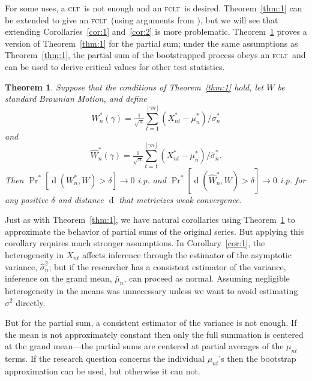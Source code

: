 \documentclass[11pt]{article}
\newtheorem{thm}{Theorem}
\theoremstyle{definition}
\DeclareMathOperator{\dist}{d}
\DeclareMathOperator{\pr}{Pr}
\newcommand{\clt}{\textsc{clt}}
\newcommand{\fclt}{\textsc{fclt}}
\begin{document}
For some uses, a \clt\ is not enough and an \fclt\ is desired.
Theorem~\ref{thm:1} can be extended to give an \fclt\ (using
arguments from \citealp{JoD:00b}), but we will see that extending 
Corollaries~\ref{cor:1} and~\ref{cor:2} is more problematic.
Theorem~\ref{thm:2} proves a version of Theorem~\ref{thm:1} for the
partial sum; under the same assumptions as Theorem~\ref{thm:1}, the
partial sum of the bootstrapped process obeys an \fclt\ and can be
used to derive critical values for other test statistics.

\begin{thm}\label{thm:2}
  Suppose that the conditions of Theorem~\ref{thm:1} hold, let $W$ be
  standard Brownian Motion, and define
  \begin{equation}
    \label{eq:7}
    W_n^{*}(\gamma) = \tfrac{1}{\sqrt{n}}
    \sum_{t=1}^{\lfloor \gamma n \rfloor} (X^*_{nt} - \mu_n^{*}) / \sigma_{n}^{*}
  \end{equation}
  and 
  \begin{equation}
    \label{eq:7}
    \hat{W}_n^{*}(\gamma) = \tfrac{1}{\sqrt{n}}
    \sum_{t=1}^{\lfloor \gamma n \rfloor} (X^*_{nt} - \mu_n^{*}) / \hat\sigma_n^{*}.
  \end{equation}
  Then $\pr^{*}[\dist(W_n^{*}, W) > \delta] \to 0$ i.p. and
  $\pr^{*}[\dist(\hat{W}_n^{*}, W) > \delta] \to 0$ i.p. for any
  positive $\delta$ and distance $\dist$ that metricizes weak
  convergence.
\end{thm}

Just as with Theorem~\ref{thm:1}, we have natural corollaries using
Theorem~\ref{thm:2} to approximate the behavior of partial sums of the
original series.  But applying this corollary requires much stronger
assumptions.  In Corollary~\ref{cor:1}, the
heterogeneity in $X_{nt}$ affects inference through the estimator of
the asymptotic variance, $\hat{\sigma}_n^2$; but if the researcher
has a consistent estimator of the variance, inference on the grand
mean, $\bar{\mu}_{n}$, can proceed as normal.
Assuming negligible heterogeneity in the means was unnecessary unless
we want to avoid estimating $\sigma^2$ directly.

But for the partial sum, a consistent estimator of the variance is not
enough.  If the mean is not approximately constant then only the full
summation is centered at the grand mean---the partial sums are
centered at partial averages of the $\mu_{nt}$ terms.  If the research
question concerns the individual $\mu_{nt}$'s then the bootstrap
approximation can be used, but otherwise it can not.
\end{document}
